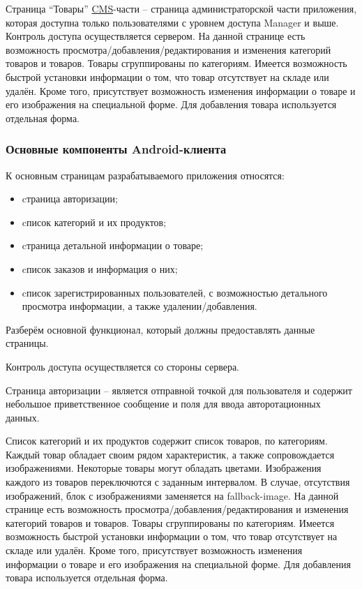 Страница “Товары” \hyperlink{gloss:cms}{CMS}-части – страница администраторской части приложения, которая доступна только пользователями с уровнем доступа Manager и выше.
Контроль доступа осуществляется сервером.
На данной странице есть возможность просмотра/добавления/редактирования и изменения категорий товаров и товаров.
Товары сгруппированы по категориям.
Имеется возможность быстрой установки информации о том, что товар отсутствует на складе или удалён.
Кроме того, присутствует возможность изменения информации о товаре и его изображения на специальной форме.
Для добавления товара используется отдельная форма.


\subsubsection{Основные компоненты Android-клиента}

К основным страницам разрабатываемого приложения относятся:

\begin{itemize}
    \item cтраница авторизации;
    \item cписок категорий и их продуктов;
    \item cтраница детальной информации о товаре;
    \item cписок заказов и информация о них;
    \item cписок зарегистрированных пользователей, с возможностью детального просмотра информации, а также удалении/добавления.
\end{itemize}

Разберём основной функционал, который должны предоставлять данные страницы.

Контроль доступа осуществляется со стороны сервера.

Страница авторизации – является отправной точкой для пользователя и содержит небольшое приветственное сообщение и поля для ввода авторотационных данных.

Список категорий и их продуктов содержит список товаров, по категориям.
Каждый товар обладает своим рядом характеристик, а также сопровождается изображениями.
Некоторые товары могут обладать цветами.
Изображения каждого из товаров переключются с заданным интервалом.
В случае, отсутствия изображений, блок с изображениями заменяется на fallback-image.
На данной странице есть возможность просмотра/добавления/редактирования и изменения категорий товаров и товаров.
Товары сгруппированы по категориям.
Имеется возможность быстрой установки информации о том, что товар отсутствует на складе или удалён.
Кроме того, присутствует возможность изменения информации о товаре и его изображения на специальной форме.
Для добавления товара используется отдельная форма.
